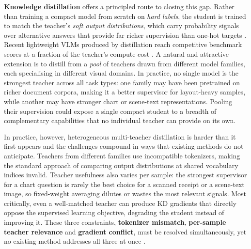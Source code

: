\textbf{Knowledge distillation} offers a principled route to closing this
gap. Rather than training a compact model from scratch on \textit{hard labels}, the
student is trained to match the teacher's \textit{soft output distributions}, which
carry probability signals over alternative answers that provide far richer
supervision than one-hot targets
\cite{hinton2015distillingknowledgeneuralnetwork,xu2024surveyknowledgedistillationlarge}.
Recent lightweight VLMs produced by distillation reach competitive benchmark
scores at a fraction of the teacher's compute cost
\cite{chu2023mobilevlm,zhou2024tinyllava,marafioti2025smolvlm}. A natural
and attractive extension is to distill from a \textit{pool} of teachers drawn
from different model families, each specialising in different visual domains.
In practice, no single model is the strongest teacher across all task types:
one family may have been pretrained on richer document corpora, making it a
better supervisor for layout-heavy samples, while another may have stronger
chart or scene-text representations. Pooling their supervision could expose
a single compact student to a breadth of complementary capabilities that no
individual teacher can provide on its own.

In practice, however, heterogeneous multi-teacher distillation is harder
than it first appears and the challenges compound in ways that existing
methods do not anticipate. Teachers from different families use incompatible
tokenizers, making the standard approach of comparing output distributions
at shared vocabulary indices invalid. Teacher usefulness also varies per
sample: the strongest supervisor for a chart question is rarely the best
choice for a scanned receipt or a scene-text image, so fixed-weight
averaging dilutes or wastes the most relevant signals. Most critically, even
a well-matched teacher can produce KD gradients that directly oppose the
supervised learning objective, degrading the student instead of improving it.
These three constraints, \textbf{tokenizer mismatch}, \textbf{per-sample teacher relevance}
and \textbf{gradient conflict}, must be resolved simultaneously, yet no existing
method addresses all three at once
\cite{boizard2024towardscrosstokenizerdistillation,yuan2020reinforcedmultiteacherselection,yu2024selectdistill}.

